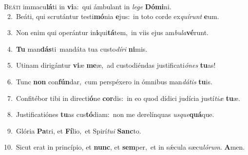 \lettrine{\initial\textcolor{\initialcolor}{B}}{eáti} immacu\-\textbf{lá}\-ti in \textbf{vi}\-a:~\star qui ámbulant in \textit{le}\-\textit{ge} \textbf{Dó}\-\textbf{mi}ni.\\
{\numbfont\textcolor{\numbcolor}{~2.}}~Beáti, qui scrutántur testi\-\textbf{mó}\-nia \textbf{e}\-jus:~\star in toto corde ex\-\textit{quí}\-\textit{runt} \textbf{e}\-um.\par
{\numbfont\textcolor{\numbcolor}{~3.}}~Non enim qui operántur in\-\textbf{i}\-qui\-\textbf{tá}\-tem,~\star in viis ejus am\-\textit{bu}\-\textit{la}\textbf{vé}runt.\par
{\numbfont\textcolor{\numbcolor}{~4.}}~\textbf{Tu} man\-\textbf{dás}\-ti~\star mandáta tua custo\-\textit{dí}\-\textit{ri} \textbf{ni}\-mis.\par
{\numbfont\textcolor{\numbcolor}{~5.}}~Utinam dirigántur \textbf{vi}\-æ \textbf{me}\-æ,~\star ad custodiéndas justificati\-\textit{ó}\-\textit{nes} \textbf{tu}\-as!\par
{\numbfont\textcolor{\numbcolor}{~6.}}~Tunc \textbf{non} con\-\textbf{fún}\-dar,~\star cum perspéxero in ómnibus man\-\textit{dá}\-\textit{tis} \textbf{tu}\-is.\par
{\numbfont\textcolor{\numbcolor}{~7.}}~Confitébor tibi in directi\-\textbf{ó}\-ne \textbf{cor}\-dis:~\star in eo quod dídici judícia justí\-\textit{ti}\-\textit{æ} \textbf{tu}\-æ.\par
{\numbfont\textcolor{\numbcolor}{~8.}}~Justificatiónes \textbf{tu}\-as cus\-\textbf{tó}\-diam:~\star non me derelínquas \textit{us}\-\textit{que}\textbf{quá}que.\par
{\numbfont\textcolor{\numbcolor}{~9.}}~Glória \textbf{Pa}\-tri, et \textbf{Fí}\-lio,~\star et Spirí\-\textit{tu}\-\textit{i} \textbf{Sanc}\-to.\par
{\numbfont\textcolor{\numbcolor}{10.}}~Sicut erat in princípio, et \textbf{nunc}\-, et \textbf{sem}\-per,~\star et in sǽcula sæcu\-\textit{ló}\-\textit{rum}. \textbf{A}\-men.\par
